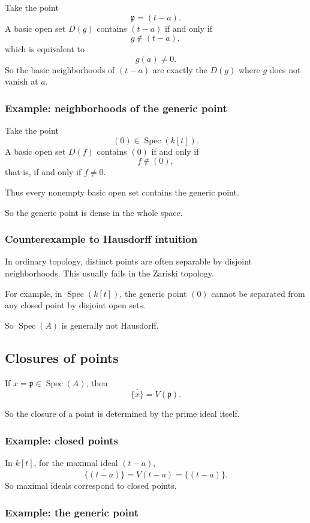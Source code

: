 \documentclass[12pt,a4paper]{article}
\theoremstyle{notespace}
\newcommand{\Spec}{\operatorname{Spec}}
\newcommand{\mf}{\mathfrak}
\theoremstyle{definition}
\begin{document}
Take the point
\[
\mf p=(t-a).
\]
A basic open set \(D(g)\) contains \((t-a)\) if and only if
\[
g\notin (t-a),
\]
which is equivalent to
\[
g(a)\neq 0.
\]
So the basic neighborhoods of \((t-a)\) are exactly the \(D(g)\) where \(g\) does not vanish at \(a\).

\subsubsection{Example: neighborhoods of the generic point}

Take the point
\[
(0)\in \Spec(k[t]).
\]
A basic open set \(D(f)\) contains \((0)\) if and only if
\[
f\notin (0),
\]
that is, if and only if \(f\neq 0\).

Thus every nonempty basic open set contains the generic point.

So the generic point is dense in the whole space.

\subsubsection{Counterexample to Hausdorff intuition}

In ordinary topology, distinct points are often separable by disjoint neighborhoods. This usually fails in the Zariski topology.

For example, in \(\Spec(k[t])\), the generic point \((0)\) cannot be separated from any closed point by disjoint open sets.

So \(\Spec(A)\) is generally not Hausdorff.

\subsection{Closures of points}

If \(x=\mf p\in \Spec(A)\), then
\[
\overline{\{x\}}=V(\mf p).
\]

So the closure of a point is determined by the prime ideal itself.

\subsubsection{Example: closed points}

In \(k[t]\), for the maximal ideal \((t-a)\),
\[
\overline{\{(t-a)\}}=V(t-a)=\{(t-a)\}.
\]
So maximal ideals correspond to closed points.

\subsubsection{Example: the generic point}
\end{document}
